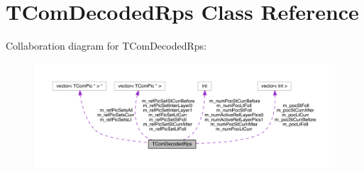 \hypertarget{class_t_com_decoded_rps}{}\section{T\+Com\+Decoded\+Rps Class Reference}
\label{class_t_com_decoded_rps}


Collaboration diagram for T\+Com\+Decoded\+Rps\+:
\nopagebreak
\begin{figure}[H]
\begin{center}
\leavevmode
\includegraphics[width=350pt]{da/d4c/class_t_com_decoded_rps__coll__graph}
\end{center}
\end{figure}
